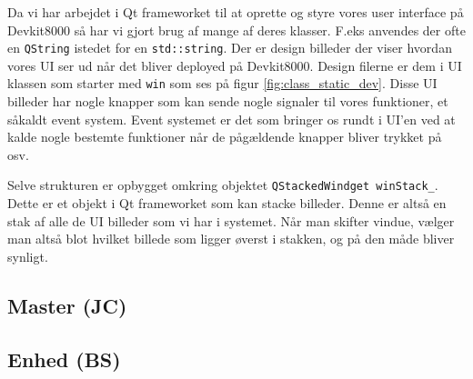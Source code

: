 Da vi har arbejdet i Qt frameworket til at oprette og styre vores user interface på Devkit8000 så har vi gjort brug af mange af deres klasser. F.eks anvendes der ofte en \verb+QString+ istedet for en \verb+std::string+. Der er design billeder der viser hvordan vores UI ser ud når det bliver deployed på Devkit8000. Design filerne er dem i UI klassen som starter med \verb+win+ som ses på figur \ref{fig:class_static_dev}. Disse UI billeder har nogle knapper som kan sende nogle signaler til vores funktioner, et såkaldt event system. Event systemet er det som bringer os rundt i UI'en ved at kalde nogle bestemte funktioner når de pågældende knapper bliver trykket på osv.

Selve strukturen er opbygget omkring objektet \verb+QStackedWindget winStack_+. Dette er et objekt i Qt frameworket som kan stacke billeder. Denne er altså en stak af alle de UI billeder som vi har i systemet. Når man skifter vindue, vælger man altså blot hvilket billede som ligger øverst i stakken, og på den måde bliver synligt. 

\subsection{Master (JC)}


\clearpage

\subsection{Enhed (BS)}


